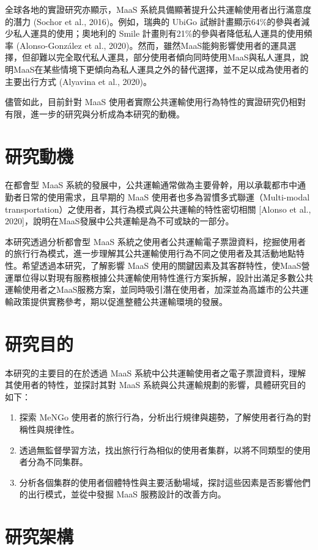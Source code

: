 全球各地的實證研究亦顯示，MaaS
系統具備顯著提升公共運輸使用者出行滿意度的潛力 (Sochor et al.,
2016)。例如，瑞典的 UbiGo
試辦計畫顯示64\%的參與者減少私人運具的使用；奧地利的 Smile
計畫則有21\%的參與者降低私人運具的使用頻率 (Alonso-González et al.,
2020)。然而，雖然MaaS能夠影響使用者的運具選擇，但卻難以完全取代私人運具，部分使用者傾向同時使用MaaS與私人運具，說明MaaS在某些情境下更傾向為私人運具之外的替代選擇，並不足以成為使用者的主要出行方式
(Alyavina et al., 2020)。

儘管如此，目前針對 MaaS
使用者實際公共運輸使用行為特性的實證研究仍相對有限，進一步的研究與分析成為本研究的動機。

\section{研究動機}\label{ux7814ux7a76ux52d5ux6a5f}

在都會型 MaaS
系統的發展中，公共運輸通常做為主要骨幹，用以承載都市中通勤者日常的使用需求，且早期的
MaaS 使用者也多為習慣多式聯運（Multi-modal
transportation）之使用者，其行為模式與公共運輸的特性密切相關 {[}Alonso
et al., 2020{]}，說明在MaaS發展中公共運輸是為不可或缺的一部分。

本研究透過分析都會型 MaaS
系統之使用者公共運輸電子票證資料，挖掘使用者的旅行行為模式，進一步理解其公共運輸使用行為不同之使用者及其活動地點特性。希望透過本研究，了解影響
MaaS
使用的關鍵因素及其客群特性，使MaaS營運單位得以對現有服務根據公共運輸使用特性進行方案拆解，設計出滿足多數公共運輸使用者之MaaS服務方案，並同時吸引潛在使用者，加深並為高雄市的公共運輸政策提供實務參考，期以促進整體公共運輸環境的發展。

\section{研究目的}\label{ux7814ux7a76ux76eeux7684}

本研究的主要目的在於透過 MaaS
系統中公共運輸使用者之電子票證資料，理解其使用者的特性，並探討其對 MaaS
系統與公共運輸規劃的影響，具體研究目的如下：

\begin{enumerate}
\def\labelenumi{\arabic{enumi}.}
\tightlist
\item
  探索 MeNGo
  使用者的旅行行為，分析出行規律與趨勢，了解使用者行為的對稱性與規律性。
\item
  透過無監督學習方法，找出旅行行為相似的使用者集群，以將不同類型的使用者分為不同集群。
\item
  分析各個集群的使用者個體特性與主要活動場域，探討這些因素是否影響他們的出行模式，並從中發掘
  MaaS 服務設計的改善方向。
\end{enumerate}

\section{研究架構}\label{ux7814ux7a76ux67b6ux69cb}
